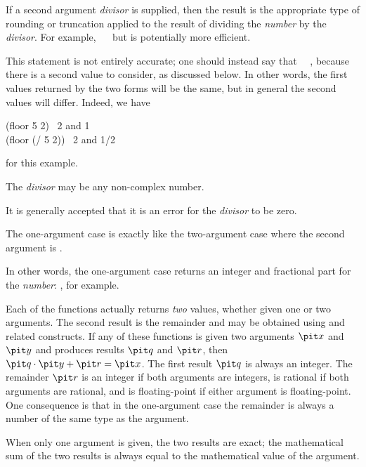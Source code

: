 \begin{defun}[Function]
If a second argument {\it divisor} is supplied, then the result
is the appropriate type of rounding or truncation applied to the
result of dividing the {\it number} by the {\it divisor}.
For example, ~\EQ~ but is potentially more
efficient.
\begin{new}%
This statement is not entirely accurate; one should instead say that
~\EQ~,
because there is a second value to consider, as discussed below.
In other words, the first values returned by the two forms will be the same, but
in general the second values will differ.  Indeed, we have
\begin{lisp}
(floor 5 2) \EV\ 2 {\rm and} 1 \\
(floor (/ 5 2)) \EV\ 2 {\rm and} 1/2
\end{lisp}
for this example.
\end{new}
The {\it divisor} may be any non-complex number.
\begin{new}%
It is generally accepted that it is an error for the {\it divisor} to be zero.
\end{new}
The one-argument case is exactly like the two-argument case where the second
argument is .

\begin{newer}
In other words, the one-argument case returns an integer and fractional part
for the {\it number}: , for example.
\end{newer}
Each of the functions actually returns {\it two} values,
whether given one or two arguments.  The second
result is the remainder and may be obtained using
 and related constructs.
If any of these functions is given two arguments ${\it x}$ and ${\it y}$
and produces results ${\it q}$ and ${\it r}$, then ${\it q} \cdot {\it y}+{\it r}={\it x}$.
The first result ${\it q}$ is always an integer.
The remainder ${\it r}$ is an integer if both arguments are integers,
is rational if both arguments are rational,
and is floating-point if either argument is floating-point.
One consequence is that
in the one-argument case the remainder is always a number of the same type
as the argument.

When only one argument is given, the two results are exact;
the mathematical sum of the two results is always equal to the
mathematical value of the argument.

\goodbreak


\end{defun}
